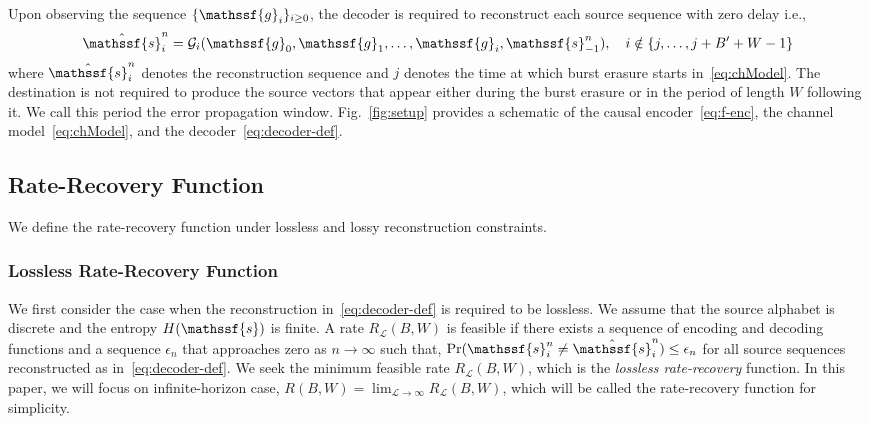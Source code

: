 \documentclass[journal, twocolumn, 10pt]{IEEEtran}
\newcommand{\eps}{\varepsilon}
\newcommand{\rvg}{{\mathssf{g}}}    %
\newcommand{\rvs}{{\mathssf{s}}}    %
\begin{document}
Upon observing the sequence $\{\rvg_i\}_{i\ge 0}$, the decoder is required to reconstruct each source sequence with zero delay i.e., 
\begin{align}
\hat{\rvs}^{n}_i=\mathcal{G}_{i}(\rvg_0, \rvg_1, \ldots, \rvg_{i}, \rvs_{-1}^n), \quad i \notin \{j, \ldots, j+B'+W-1\} \label{eq:decoder-def}
\end{align}
where $\hat{\rvs}_i^{n}$ denotes the reconstruction sequence and $j$ denotes the time at which burst erasure starts in~\eqref{eq:chModel}. The destination is not required to produce the source vectors that appear either during the burst erasure or in the period of length $W$ following it. We call this period the error propagation window. Fig.~\ref{fig:setup} provides a schematic of the causal encoder~\eqref{eq:f-enc}, the channel model~\eqref{eq:chModel}, and the decoder~\eqref{eq:decoder-def}. 

\subsection{Rate-Recovery Function}  
We define the rate-recovery function under lossless and lossy reconstruction constraints. 
\subsubsection{Lossless Rate-Recovery Function}
We first consider the case when the reconstruction in~\eqref{eq:decoder-def} is required to be lossless. 
We assume that the source alphabet is discrete and the entropy $H(\rvs)$ is finite. 
A rate $R_{\mathcal{L}}(B, W)$ is feasible if there exists a sequence of encoding and decoding functions and a sequence $\epsilon_{n}$ that approaches zero as $n \to \infty$ such that, $\Pr(\rvs_i^n \neq \hat{\rvs}_i^{n})\leq\epsilon_{n}$ for all source sequences reconstructed as in~\eqref{eq:decoder-def}. We seek the minimum feasible rate $R_{\mathcal{L}}(B,W)$, which is the {\em lossless rate-recovery} function. 
In this paper, we will focus on infinite-horizon case, $R(B,W) =\lim_{\mathcal{L}\to\infty}R_{\mathcal{L}}(B,W)$, which will be  called the rate-recovery function for simplicity.
\end{document}
